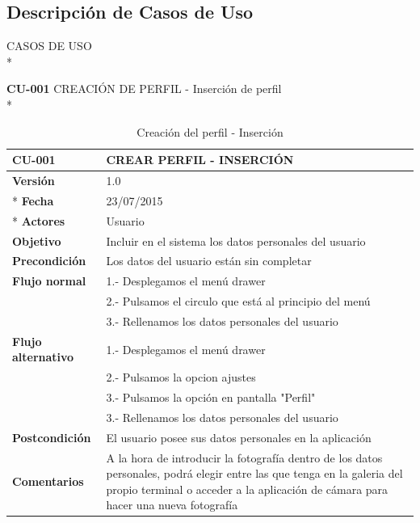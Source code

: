 \documentclass[../pfc.tex]{subfiles}
\begin{document}
	\subsection{Descripción de Casos de Uso}
	
	CASOS DE USO\\*
	
	\textbf{CU-001} CREACIÓN DE PERFIL - Inserción de perfil\\*
	
	\begin{table}[!hbt]
		\centering
		\begin{tabular}[t]{|p{3cm}|p{9.5cm}|}
				\hline \textbf{CU-001} & \textbf{CREAR PERFIL - INSERCIÓN} \\*
				\hline\hline \textbf{Versión} & 1.0 \\ *
				\hline\hline \textbf{Fecha} & 23/07/2015 \\ *
				\hline\textbf{Actores} 	& Usuario\\*
				\hline \textbf{Objetivo} & Incluir en el sistema los datos personales del usuario\\* 			
				\hline \textbf{Precondición} & Los datos del usuario están sin completar \\* 
				\hline \textbf{Flujo normal} & 1.- Desplegamos el menú drawer \\* 
											 & 2.- Pulsamos el circulo que está al principio del menú \\*	
											 & 3.- Rellenamos los datos personales del usuario\\*	
				\hline \textbf{Flujo alternativo} & 1.- Desplegamos el menú drawer \\* 
 												  & 2.- Pulsamos la opcion ajustes \\*	
												  & 3.- Pulsamos la opción en pantalla "Perfil" \\*	
												  & 3.- Rellenamos los datos personales del usuario \\*	
				\hline \textbf{Postcondición} & El usuario posee sus datos personales en la aplicación \\* 
				\hline \textbf{Comentarios}   & A la hora de introducir la fotografía dentro de los datos personales, podrá elegir entre las que tenga en la galeria del propio terminal o acceder a la aplicación de cámara para hacer una nueva fotografía\\*
				\hline
			\end{tabular}
			\caption{Creación del perfil - Inserción}
			\label{tabla:caso001}
	\end{table}
	
\end{document}
